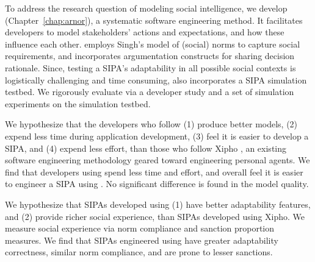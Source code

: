 To address the research question of modeling social intelligence, we
develop \frameworkA (Chapter~\ref{chap:arnor}), a systematic 
software engineering method. It facilitates developers to model stakeholders' actions
and expectations, and how these influence each other. \frameworkA
employs Singh's  model of (social) norms to
capture social requirements, and incorporates argumentation constructs
\citep{BenchCapon-2007-Argumentation+AI} for sharing decision rationale.
Since, testing a SIPA's adaptability in all possible social contexts is
logistically challenging and time consuming, \frameworkA also
incorporates a SIPA simulation testbed. We rigorously evaluate
\frameworkA via a developer study and a set of simulation experiments on
the simulation testbed. 


We hypothesize that the developers who follow \frameworkA (1) produce
better models, (2) expend less time during application development, (3) feel it is easier to develop a
SIPA, and (4) expend less effort, than those who follow Xipho \cite{Murukannaiah-AAMAS14-Xipho}, an existing software engineering methodology geared toward engineering personal agents. We find
that developers using \frameworkA spend less time and effort, and
overall feel it is easier to engineer a SIPA using \frameworkA. No
significant difference is found in the model quality.

We hypothesize that SIPAs developed using \frameworkA (1) have better
adaptability features, and (2) provide richer social experience, than
SIPAs developed using Xipho. We measure social experience via norm
compliance and sanction proportion measures. We find that SIPAs
engineered using \frameworkA have greater adaptability correctness,
similar norm compliance, and are prone to lesser sanctions.

